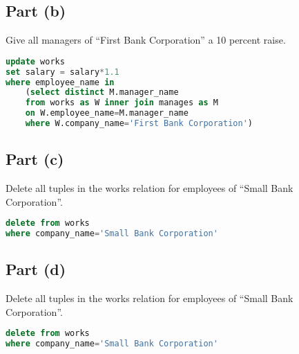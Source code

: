 \documentclass{article}
\begin{document}
\subsection{Part (b)}
Give all managers of “First Bank Corporation” a 10 percent raise.
\begin{lstlisting}[language=sql]
update works
set salary = salary*1.1
where employee_name in 
    (select distinct M.manager_name
    from works as W inner join manages as M
    on W.employee_name=M.manager_name
    where W.company_name='First Bank Corporation')
\end{lstlisting}

\subsection{Part (c)}
Delete all tuples in the works relation for employees of “Small Bank Corporation”.
\begin{lstlisting}[language=sql]
delete from works
where company_name='Small Bank Corporation'
\end{lstlisting}

\subsection{Part (d)}
Delete all tuples in the works relation for employees of “Small Bank Corporation”.
\begin{lstlisting}[language=sql]
delete from works
where company_name='Small Bank Corporation'
\end{lstlisting}
\end{document}
